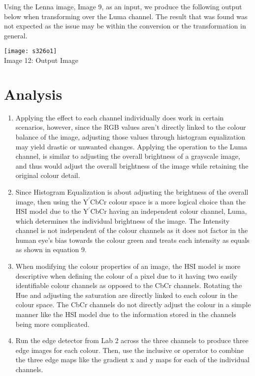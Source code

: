\documentclass{article}
\begin{document}
	Using the Lenna image, Image 9, as an input, we produce the following output below when transforming over the Luma channel. The result that was found was not expected as the issue may be within the conversion or the transformation in general.\\
	
	\begin{center}
		\noindent \texttt{[image: s326o1]}\\
		Image 12: Output Image 
	\end{center}
	
	\section{Analysis}
	
	\begin{enumerate}
		\item Applying the effect to each channel individually does work in certain scenarios, however, since the RGB values aren't directly linked to the colour balance of the image, adjusting those values through histogram equalization may yield drastic or unwanted changes. Applying the operation to the Luma channel, is similar to adjusting the overall brightness of a grayscale image, and thus would adjust the overall brightness of the image while retaining the original colour detail.
		
		\item Since Histogram Equalization is about adjusting the brightness of the overall image, then using the $\textrm{Y}^\prime$CbCr colour space is a more logical choice than the HSI model due to the $\textrm{Y}^\prime$CbCr having an independent colour channel, Luma, which determines the individual brightness of the image. The Intensity channel is not independent of the colour channels as it does not factor in the human eye's bias towards the colour green and treats each intensity as equals as shown in equation 9.
		
		\item When modifying the colour properties of an image, the HSI model is more descriptive when defining the colour of a pixel due to it having two easily identifiable colour channels as opposed to the CbCr channels. Rotating the Hue and adjusting the saturation are directly linked to each colour in the colour space. The CbCr channels do not directly adjust the colour in a simple manner like the HSI model due to the information stored in the channels being more complicated.
		
		\item Run the edge detector from Lab 2 across the three channels to produce three edge images for each colour. Then, use the inclusive or operator to combine the three edge maps like the gradient x and y maps for each of the individual channels.
	\end{enumerate}
	
\end{document}
